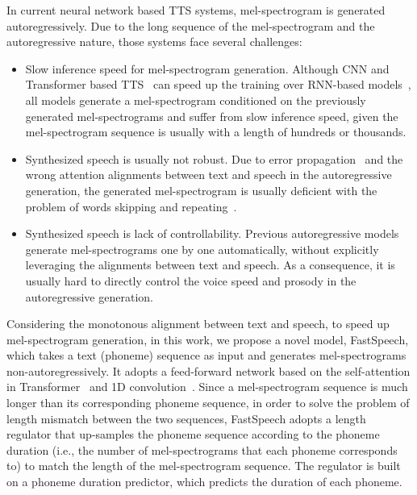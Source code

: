 \documentclass{article}
\begin{document}
In current neural network based TTS systems, mel-spectrogram is generated autoregressively. Due to the long sequence of the mel-spectrogram and the autoregressive nature, those systems face several challenges: 
\begin{itemize}
\item Slow inference speed for mel-spectrogram generation. Although CNN and Transformer based TTS~\citep{ping2018deep,li2018close} can speed up the training over RNN-based models~\citep{shen2018natural}, all models generate a mel-spectrogram conditioned on the previously generated mel-spectrograms and suffer from slow inference speed, given the mel-spectrogram sequence is usually with a length of hundreds or thousands.
\item Synthesized speech is usually not robust. Due to error propagation~\citep{bengio2015scheduled} and the wrong attention alignments between text and speech in the autoregressive generation, the generated mel-spectrogram is usually deficient with the problem of words skipping and repeating~\citep{ping2018deep}. 
\item Synthesized speech is lack of controllability. Previous autoregressive models generate mel-spectrograms one by one automatically, without explicitly leveraging the alignments between text and speech. As a consequence, it is usually hard to directly control the voice speed and prosody in the autoregressive generation.
\end{itemize}

Considering the monotonous alignment between text and speech, to speed up mel-spectrogram generation, in this work, we propose a novel model, FastSpeech, which takes a text (phoneme) sequence as input and generates mel-spectrograms non-autoregressively. It adopts a feed-forward network based on the self-attention in Transformer~\citep{vaswani2017attention} and 1D convolution~\citep{gehring2017convolutional,ping2018deep,jin2018fftnet}. Since a mel-spectrogram sequence is much longer than its corresponding phoneme sequence, in order to solve the problem of length mismatch between the two sequences, FastSpeech adopts a length regulator that up-samples the phoneme sequence according to the phoneme duration (i.e., the number of mel-spectrograms that each phoneme corresponds to) to match the length of the mel-spectrogram sequence. The regulator is built on a phoneme duration predictor, which predicts the duration of each phoneme. 
\end{document}
